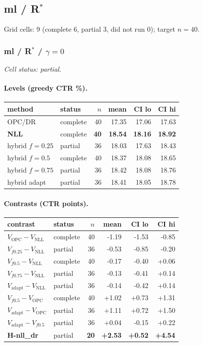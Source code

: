 \documentclass[10pt,a4paper]{article}
\begin{document}
\subsection{ml / R$^*$}
Grid cells: 9 (complete 6, partial 3, did not run 0); target $n=40$.
\subsubsection{ml / R$^*$ / $\gamma=0$}
\emph{Cell status: partial}.
\paragraph{Levels (greedy CTR \%).}
{\centering\small\begin{tabular}{llrrrr}
\toprule method & status & $n$ & mean & CI lo & CI hi \\
\midrule
OPC/DR & complete & 40 & 17.35 & 17.06 & 17.63 \\
\textbf{NLL} & complete & \textbf{40} & \textbf{18.54} & \textbf{18.16} & \textbf{18.92} \\
hybrid $f{=}0.25$ & partial & 36 & 18.03 & 17.63 & 18.43 \\
hybrid $f{=}0.5$ & complete & 40 & 18.37 & 18.08 & 18.65 \\
hybrid $f{=}0.75$ & partial & 36 & 18.42 & 18.08 & 18.76 \\
hybrid adapt & partial & 36 & 18.41 & 18.05 & 18.78 \\
\bottomrule\end{tabular}\par}
\paragraph{Contrasts (CTR points).}
{\centering\small\begin{tabular}{llrrrr}
\toprule contrast & status & $n$ & mean & CI lo & CI hi \\
\midrule
$V_{\mathrm{OPC}}-V_{\mathrm{NLL}}$ & complete & 40 & -1.19 & -1.53 & -0.85 \\
$V_{f0.25}-V_{\mathrm{NLL}}$ & partial & 36 & -0.53 & -0.85 & -0.20 \\
$V_{f0.5}-V_{\mathrm{NLL}}$ & complete & 40 & -0.17 & -0.40 & +0.06 \\
$V_{f0.75}-V_{\mathrm{NLL}}$ & partial & 36 & -0.13 & -0.41 & +0.14 \\
$V_{\mathrm{adapt}}-V_{\mathrm{NLL}}$ & partial & 36 & -0.14 & -0.42 & +0.14 \\
$V_{f0.5}-V_{\mathrm{OPC}}$ & complete & 40 & +1.02 & +0.73 & +1.31 \\
$V_{\mathrm{adapt}}-V_{\mathrm{OPC}}$ & partial & 36 & +1.11 & +0.72 & +1.50 \\
$V_{\mathrm{adapt}}-V_{f0.5}$ & partial & 36 & +0.04 & -0.15 & +0.22 \\
\textbf{H-nll\_dr} & partial & \textbf{20} & \textbf{+2.53} & \textbf{+0.52} & \textbf{+4.54} \\
\bottomrule\end{tabular}\par}
\bigskip
\end{document}
